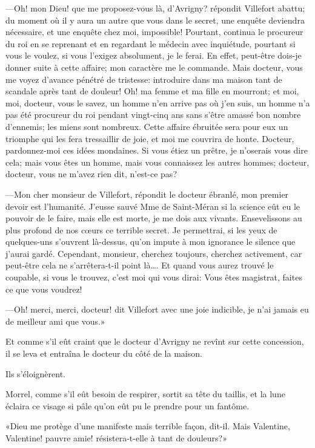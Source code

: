 —Oh! mon Dieu! que me proposez-vous là, d'Avrigny? répondit Villefort abattu; du moment où il y aura un autre que vous dans le secret, une enquête deviendra nécessaire, et une enquête chez moi, impossible! Pourtant, continua le procureur du roi en se reprenant et en regardant le médecin avec inquiétude, pourtant si vous le voulez, si vous l'exigez absolument, je le ferai. En effet, peut-être dois-je donner suite à cette affaire; mon caractère me le commande. Mais docteur, vous me voyez d'avance pénétré de tristesse: introduire dans ma maison tant de scandale après tant de douleur! Oh! ma femme et ma fille en mourront; et moi, moi, docteur, vous le savez, un homme n'en arrive pas où j'en suis, un homme n'a pas été procureur du roi pendant vingt-cinq ans sans s'être amassé bon nombre d'ennemis; les miens sont nombreux. Cette affaire ébruitée sera pour eux un triomphe qui les fera tressaillir de joie, et moi me couvrira de honte. Docteur, pardonnez-moi ces idées mondaines. Si vous étiez un prêtre, je n'oserais vous dire cela; mais vous êtes un homme, mais vous connaissez les autres hommes; docteur, docteur, vous ne m'avez rien dit, n'est-ce pas? 

—Mon cher monsieur de Villefort, répondit le docteur ébranlé, mon premier devoir est l'humanité. J'eusse sauvé Mme de Saint-Méran si la science eût eu le pouvoir de le faire, mais elle est morte, je me dois aux vivants. Ensevelissons au plus profond de nos cœurs ce terrible secret. Je permettrai, si les yeux de quelques-uns s'ouvrent là-dessus, qu'on impute à mon ignorance le silence que j'aurai gardé. Cependant, monsieur, cherchez toujours, cherchez activement, car peut-être cela ne s'arrêtera-t-il point là\dots. Et quand vous aurez trouvé le coupable, si vous le trouvez, c'est moi qui vous dirai: Vous êtes magistrat, faites ce que vous voudrez! 

—Oh! merci, merci, docteur! dit Villefort avec une joie indicible, je n'ai jamais eu de meilleur ami que vous.» 

Et comme s'il eût craint que le docteur d'Avrigny ne revînt sur cette concession, il se leva et entraîna le docteur du côté de la maison. 

Ils s'éloignèrent. 

Morrel, comme s'il eût besoin de respirer, sortit sa tête du taillis, et la lune éclaira ce visage si pâle qu'on eût pu le prendre pour un fantôme. 

«Dieu me protège d'une manifeste mais terrible façon, dit-il. Mais Valentine, Valentine! pauvre amie! résistera-t-elle à tant de douleurs?» 


